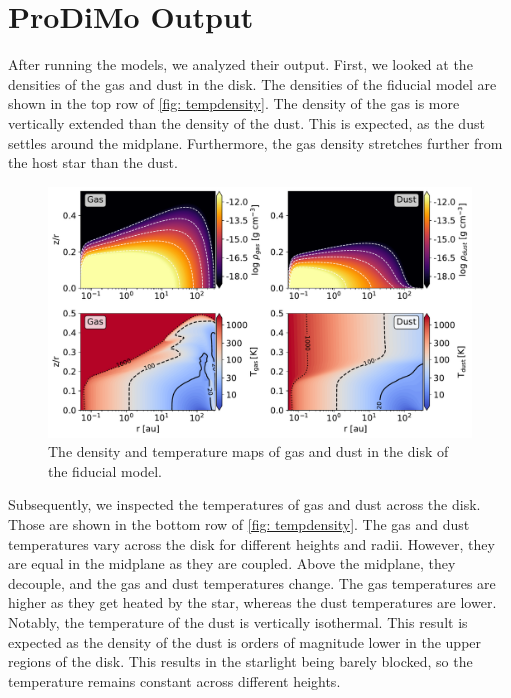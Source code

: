\documentclass[twoside, single, authoryear, semicolon]{lion-msc}
\newcommand{\4}{$_4$}
\newcommand{\3}{$_3$}
\newcommand{\2}{$_2$}
\begin{document}
\section{ProDiMo Output}

After running the models, we analyzed their output. First, we looked at the densities of the gas and dust in the disk. The densities of the fiducial model are shown in the top row of \autoref{fig: tempdensity}. The density of the gas is more vertically extended than the density of the dust. This is expected, as the dust settles around the midplane. Furthermore, the gas density stretches further from the host star than the dust.

\begin{figure}[!ht]
    \centering
    \includegraphics[width=\linewidth]{Figures/DensityTemperature.pdf}
    \caption{The density and temperature maps of gas and dust in the disk of the fiducial model.}
    \label{fig: tempdensity}
\end{figure}

Subsequently, we inspected the temperatures of gas and dust across the disk. Those are shown in the bottom row of \autoref{fig: tempdensity}.  The gas and dust temperatures vary across the disk for different heights and radii. However, they are equal in the midplane as they are coupled. Above the midplane, they decouple, and the gas and dust temperatures change. The gas temperatures are higher as they get heated by the star, whereas the dust temperatures are lower. Notably, the temperature of the dust is vertically isothermal. This result is expected as the density of the dust is orders of magnitude lower in the upper regions of the disk. This results in the starlight being barely blocked, so the temperature remains constant across different heights.
\end{document}
